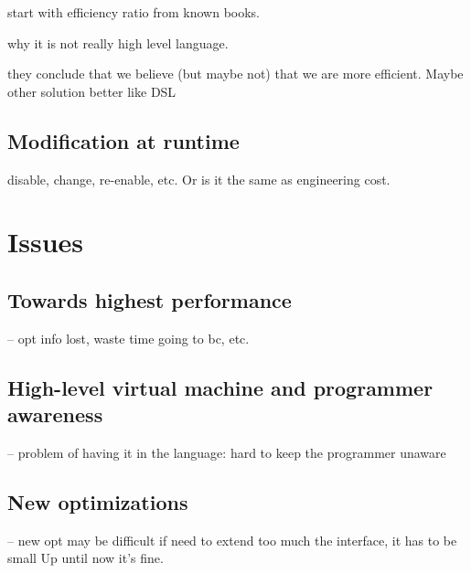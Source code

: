 \documentclass[a4paper,12pt,twoside]{../includes/ThesisStyle}
\begin{document}
start with efficiency ratio from known books.

why it is not really high level language.

they conclude that we believe (but maybe not) that we are more efficient. Maybe other solution better like DSL

\subsection{Modification at runtime}

disable, change, re-enable, etc.
Or is it the same as engineering cost.

\section{Issues}

\subsection{Towards highest performance}
-- opt info lost, waste time going to bc, etc.

\subsection{High-level virtual machine and programmer awareness}
-- problem of having it in the language: hard to keep the programmer unaware

\subsection{New optimizations}
-- new opt may be difficult if need to extend too much the interface, it has to be small
Up until now it's fine.

\ifx\wholebook\relax\else
    
\end{document}
